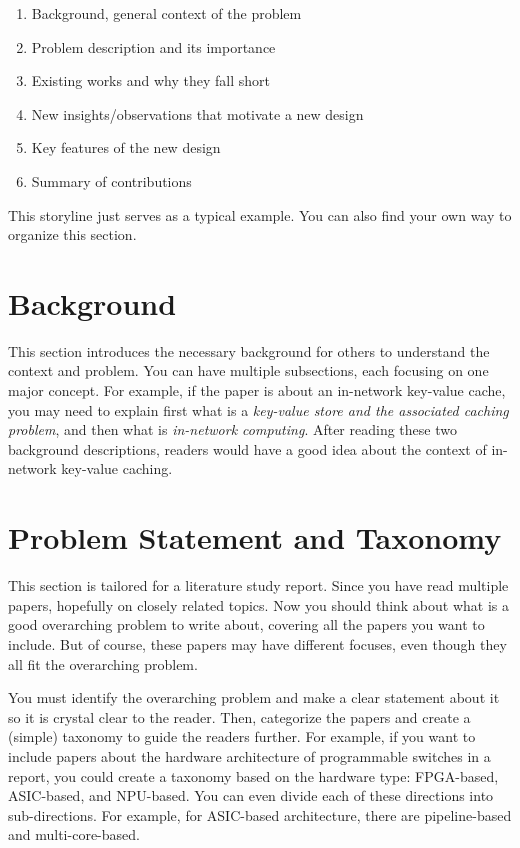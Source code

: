 \documentclass{upb-cn}
\begin{document}
\begin{enumerate}
    \item Background, general context of the problem
    \item Problem description and its importance
    \item Existing works and why they fall short
    \item New insights/observations that motivate a new design
    \item Key features of the new design
    \item Summary of contributions
\end{enumerate}

This storyline just serves as a typical example. You can also find your own way to organize this section.

\section{Background}
\label{sec:background}

This section introduces the necessary background for others to understand the context and problem. You can have multiple subsections, each focusing on one major concept. For example, if the paper is about an in-network key-value cache, you may need to explain first what is a \emph{key-value store and the associated caching problem}, and then what is \emph{in-network computing}. After reading these two background descriptions, readers would have a good idea about the context of in-network key-value caching.

\section{Problem Statement and Taxonomy}
\label{sec:problem}

This section is tailored for a literature study report. Since you have read multiple papers, hopefully on closely related topics. Now you should think about what is a good overarching problem to write about, covering all the papers you want to include. But of course, these papers may have different focuses, even though they all fit the overarching problem.

You must identify the overarching problem and make a clear statement about it so it is crystal clear to the reader. Then, categorize the papers and create a (simple) taxonomy to guide the readers further. For example, if you want to include papers about the hardware architecture of programmable switches in a report, you could create a taxonomy based on the hardware type: FPGA-based, ASIC-based, and NPU-based. You can even divide each of these directions into sub-directions. For example, for ASIC-based architecture, there are pipeline-based and multi-core-based.
\end{document}
